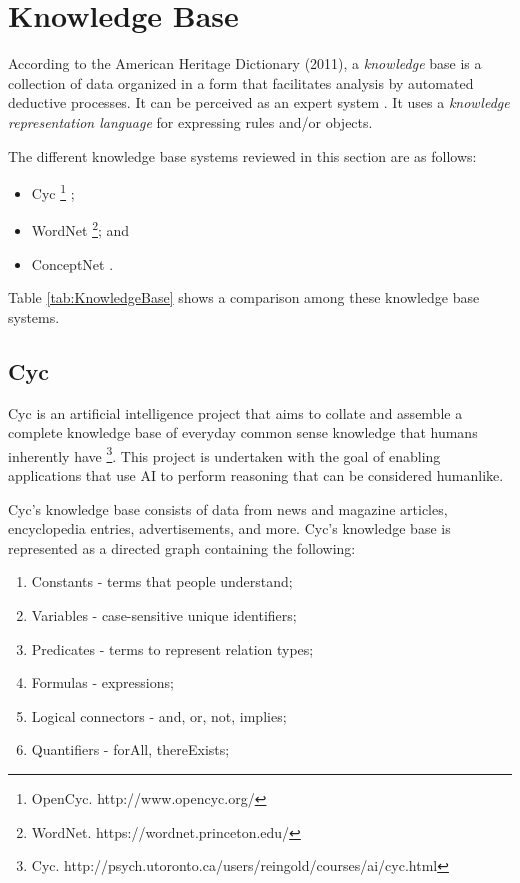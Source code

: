 \section{Knowledge Base}
According to the American Heritage Dictionary (2011), a \textit{knowledge} base is a collection of data organized in a form that facilitates analysis by automated deductive processes. It can be perceived as an expert system \cite{mars1995towards}. It uses a \textit{knowledge representation language} for expressing rules and/or objects.

The different knowledge base systems reviewed in this section are as follows:
\begin{itemize}
\item Cyc \footnote{OpenCyc. http://www.opencyc.org/} \cite{cyc1999, cycinferencing1994};
\item WordNet \footnote{WordNet. https://wordnet.princeton.edu/}; and
\item ConceptNet \cite{LiuSingh2004}.
\end{itemize}

Table \ref{tab:KnowledgeBase} shows a comparison among these knowledge base systems.

\subsection{Cyc}
Cyc is an artificial intelligence project that aims to collate and assemble a complete knowledge base of everyday common sense knowledge that humans inherently have \footnote{Cyc. http://psych.utoronto.ca/users/reingold/courses/ai/cyc.html}. This project is undertaken with the goal of enabling applications that use AI to perform reasoning that can be considered humanlike.

Cyc's knowledge base consists of data from news and magazine articles, encyclopedia entries, advertisements, and more. Cyc's knowledge base is represented as a directed graph containing the following:
\begin{enumerate}
	\item Constants - terms that people understand;
	\item Variables - case-sensitive unique identifiers;
	\item Predicates - terms to represent relation types;
	\item Formulas - expressions;
	\item Logical connectors - and, or, not, implies;
	\item Quantifiers - forAll, thereExists;
\end{enumerate}

